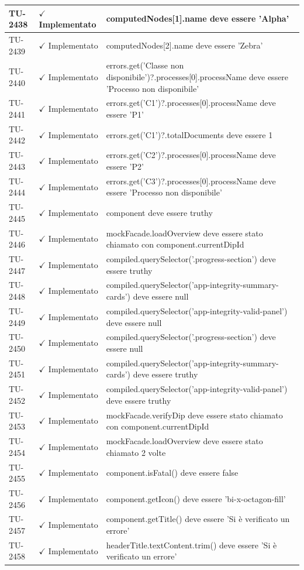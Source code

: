 ﻿\documentclass[a4paper,12pt]{article}
\newcommand{\ok}{\textcolor{green!60!black}{$\checkmark$ Implementato}}
\begin{document}
\begin{longtable}{|p{2cm}|p{3.5cm}|p{9.5cm}|}
\hline
TU-2438 & \ok & computedNodes[1].name deve essere 'Alpha' \\
\hline
TU-2439 & \ok & computedNodes[2].name deve essere 'Zebra' \\
\hline
TU-2440 & \ok & errors.get('Classe non disponibile')?.processes[0].processName deve essere 'Processo non disponibile' \\
\hline
TU-2441 & \ok & errors.get('C1')?.processes[0].processName deve essere 'P1' \\
\hline
TU-2442 & \ok & errors.get('C1')?.totalDocuments deve essere 1 \\
\hline
TU-2443 & \ok & errors.get('C2')?.processes[0].processName deve essere 'P2' \\
\hline
TU-2444 & \ok & errors.get('C3')?.processes[0].processName deve essere 'Processo non disponibile' \\
\hline
TU-2445 & \ok & component deve essere truthy \\
\hline
TU-2446 & \ok & mockFacade.loadOverview deve essere stato chiamato con component.currentDipId \\
\hline
TU-2447 & \ok & compiled.querySelector('.progress-section') deve essere truthy \\
\hline
TU-2448 & \ok & compiled.querySelector('app-integrity-summary-cards') deve essere null \\
\hline
TU-2449 & \ok & compiled.querySelector('app-integrity-valid-panel') deve essere null \\
\hline
TU-2450 & \ok & compiled.querySelector('.progress-section') deve essere null \\
\hline
TU-2451 & \ok & compiled.querySelector('app-integrity-summary-cards') deve essere truthy \\
\hline
TU-2452 & \ok & compiled.querySelector('app-integrity-valid-panel') deve essere truthy \\
\hline
TU-2453 & \ok & mockFacade.verifyDip deve essere stato chiamato con component.currentDipId \\
\hline
TU-2454 & \ok & mockFacade.loadOverview deve essere stato chiamato 2 volte \\
\hline
TU-2455 & \ok & component.isFatal() deve essere false \\
\hline
TU-2456 & \ok & component.getIcon() deve essere 'bi-x-octagon-fill' \\
\hline
TU-2457 & \ok & component.getTitle() deve essere 'Si è verificato un errore' \\
\hline
TU-2458 & \ok & headerTitle.textContent.trim() deve essere 'Si è verificato un errore' \\

\end{longtable}
\end{document}
